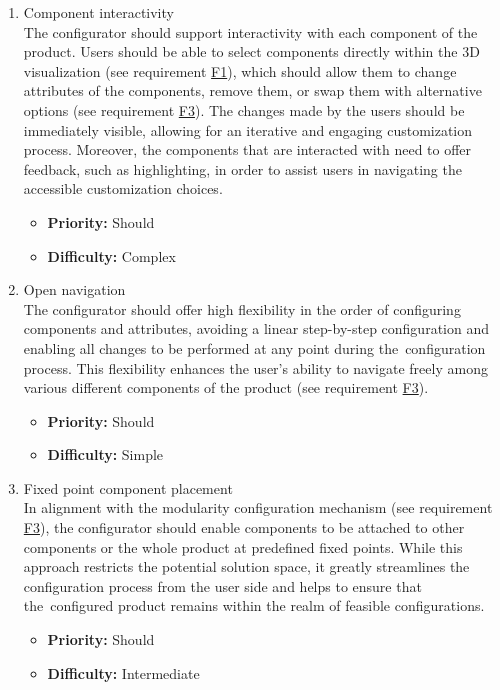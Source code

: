 \begin{enumerate}[label=\textbf{F\arabic*:}, leftmargin=30pt]
\item \label{itm:F4} Component interactivity
\vspace{2pt}
\\The configurator should support interactivity with each component of the product. Users should be able to select components directly within the 3D visualization (see requirement \hyperref[itm:F1]{F1}), which should allow them to change attributes of the components, remove them, or swap them with alternative options (see requirement \hyperref[itm:F3]{F3}). The changes made by the users should be immediately visible, allowing for an iterative and engaging customization process. Moreover, the components that are interacted with need to offer feedback, such as highlighting, in order to assist users in navigating the accessible customization choices.
\begin{itemize}[noitemsep, label=\trianglebullet]
    \item \textbf{Priority:} Should
    \item \textbf{Difficulty:} Complex
\end{itemize}
\vspace{4pt}

\item \label{itm:F5} Open navigation
\vspace{2pt}
\\The configurator should offer high flexibility in the order of configuring components and attributes, avoiding a linear step-by-step configuration and enabling all changes to be performed at any point during the~configuration process. This flexibility enhances the user's ability to navigate freely among various different components of the product (see requirement \hyperref[itm:F3]{F3}).
\begin{itemize}[noitemsep, label=\trianglebullet]
    \item \textbf{Priority:} Should
    \item \textbf{Difficulty:} Simple
\end{itemize}
\vspace{4pt}

\item \label{itm:F6} Fixed point component placement
\vspace{2pt}
\\In alignment with the modularity configuration mechanism (see requirement \hyperref[itm:F3]{F3}), the configurator should enable components to be attached to other components or the whole product at predefined fixed points. While this approach restricts the potential solution space, it greatly streamlines the configuration process from the user side and helps to ensure that the~configured product remains within the realm of feasible configurations.
\begin{itemize}[noitemsep, label=\trianglebullet]
    \item \textbf{Priority:} Should
    \item \textbf{Difficulty:} Intermediate
\end{itemize}
\vspace{4pt}


\end{enumerate}

